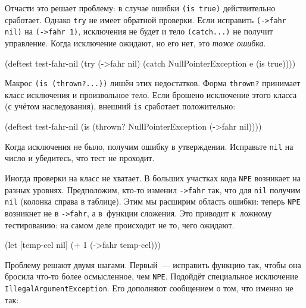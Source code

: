 Отчасти это решает проблему: в случае ошибки \verb|(is true)| действительно
сработает. Однако \verb|try| не имеет обратной проверки. Если исправить
\verb|(->fahr nil)| на \verb|(->fahr 1)|, исключения не будет и тело
\verb|(catch...)| не получит управление. Когда исключение ожидают, но его нет,
это \emph{тоже ошибка}.


\begin{english}
  \begin{clojure}
(deftest test-fahr-nil
  (try
    (->fahr nil)
    (catch NullPointerException e
      (is true))))
  \end{clojure}
\end{english}

Макрос \verb|(is (thrown?...))| лишён этих недостатков. Форма \verb|thrown?|
принимает класс исключения и произвольное тело. Если брошено исключение этого
класса (с учётом наследования), внешний \verb|is| сработает положительно:

\begin{english}
  \begin{clojure}
(deftest test-fahr-nil
  (is (thrown? NullPointerException
               (->fahr nil))))
  \end{clojure}
\end{english}

Когда исключения не было, получим ошибку в утверждении. Исправьте \verb|nil|
на число и убедитесь, что тест не проходит.


Иногда проверки на класс не хватает. В больших участках кода \verb|NPE|
возникает на разных уровнях. Предположим, кто-то изменил \verb|->fahr| так, что
для \verb|nil| получим \verb|nil| (колонка справа в таблице). Этим мы расширим
область ошибки: теперь \verb|NPE| возникнет не в \verb|->fahr|, а в~функции
сложения. Это приводит к~ложному тестированию: на самом деле происходит не то,
чего ожидают.

\begin{english}
  \begin{clojure}
(let [temp-cel nil]
  (+ 1 (->fahr temp-cel)))
  \end{clojure}
\end{english}

\label{illegal-arg}

Проблему решают двумя шагами. Первый~--- исправить функцию так, чтобы она
бросила что-то более осмысленное, чем \verb|NPE|. Подойдёт специальное
исключение \verb|IllegalArgumentException|. Его дополняют сообщением о том,
что именно не так:

